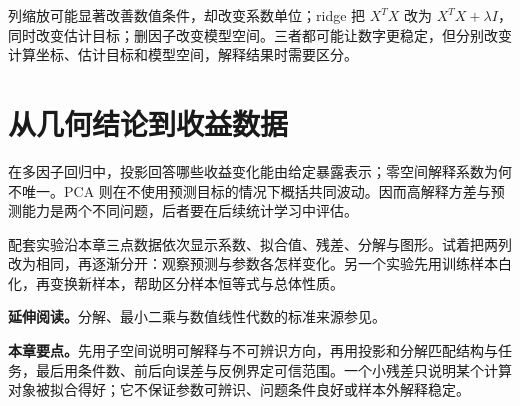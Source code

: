 \begin{note}
列缩放可能显著改善数值条件，却改变系数单位；ridge 把 $X^TX$ 改为 $X^TX+\lambda I$，同时改变估计目标；删因子改变模型空间。三者都可能让数字更稳定，但分别改变计算坐标、估计目标和模型空间，解释结果时需要区分。
\end{note}

\section{从几何结论到收益数据}

在多因子回归中，投影回答哪些收益变化能由给定暴露表示；零空间解释系数为何不唯一。PCA 则在不使用预测目标的情况下概括共同波动。因而高解释方差与预测能力是两个不同问题，后者要在后续统计学习中评估。

配套实验沿本章三点数据依次显示系数、拟合值、残差、分解与图形。试着把两列改为相同，再逐渐分开：观察预测与参数各怎样变化。另一个实验先用训练样本白化，再变换新样本，帮助区分样本恒等式与总体性质。

\noindent\textbf{延伸阅读。}分解、最小二乘与数值线性代数的标准来源参见\cite{golub2013matrix}。




\noindent\textbf{本章要点。}先用子空间说明可解释与不可辨识方向，再用投影和分解匹配结构与任务，最后用条件数、前后向误差与反例界定可信范围。一个小残差只说明某个计算对象被拟合得好；它不保证参数可辨识、问题条件良好或样本外解释稳定。
